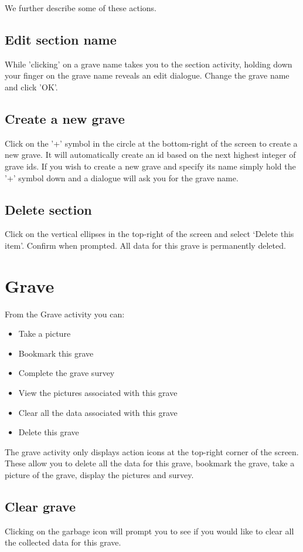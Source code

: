 \documentclass{scrreprt}
\begin{document}
We further describe some of these actions.

\subsection{Edit section name}
While 'clicking' on a grave name takes you to the section activity, holding down  your finger on the grave name reveals an edit dialogue. Change the grave name and click 'OK'.

\subsection{Create a new grave}
Click on the '+' symbol in the circle at the bottom-right of the screen to create a new grave. It will automatically create an id based on the next highest integer of grave ids. If you wish to create a new grave and specify its name simply hold the '+' symbol down and a dialogue will ask you for the grave name.

\subsection{Delete section}
Click on the vertical ellipses in the top-right of the screen and select `Delete this item'. Confirm when prompted. All data for this grave is permanently deleted.

\section{Grave}
From the Grave activity you can:
\begin{itemize}
\item Take a picture
\item Bookmark this grave
\item Complete the grave survey
\item View the pictures associated with this grave
\item Clear all the data associated with this grave
\item Delete this grave
\end{itemize}

The grave activity only displays action icons at the top-right corner of the screen. These allow you to delete all the data for this grave, bookmark the grave, take a picture of the grave, display the pictures and survey.

\subsection{Clear grave}
Clicking on the garbage icon will prompt you to see if you would like to clear all the collected data for this grave.
\end{document}
